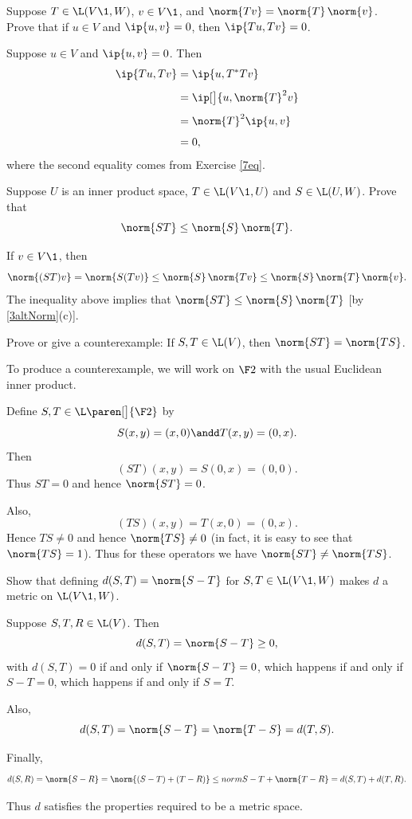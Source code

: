 \exercise
Suppose $T \in \L(V\1, W)$, $v \in V\1$, and $\norm{Tv} = \norm{T} \, \norm{v}$. Prove that if $u \in V$ and $\ip{u, v} = 0$, then
$\ip{Tu, Tv} = 0$.

\begin{Solution}
Suppose $u \in V$ and $\ip{u, v} = 0$. Then
\begin{align*}
\ip{Tu, Tv} &= \ip{u, T^* T v} \\[4bp]
&= \ip[\big]{ u, \norm{T}^2 v } \\[4bp]
&= \norm{T}^2 \ip{u, v} \\[4bp]
&= 0,
\end{align*}
where the second equality comes from Exercise \ref{7eq}.
\end{Solution}

\exercise
Suppose $U$ is an inner product space, $T \in \L(V\1, U)$ and $S \in \L(U, W)$. Prove that \label{2prod}
\[
\norm{ST} \le \norm{S} \, \norm{T}.
\]
\exercisedisplayend

\begin{Solution}
If $v \in V\1$, then
\[
\norm{(ST)v} = \norm{S(Tv)} \le \norm{S} \, \norm{Tv} \le \norm{S} \, \norm{T} \, \norm{v}.
\]
The inequality above implies that $\norm{ST} \le \norm{S} \, \norm {T}$ [by \ref{3altNorm}(c)].
\end{Solution}

\exercise
Prove or give a counterexample: If $S, T \in \L(V)$, then $\norm{ST} = \norm{TS}$.

\begin{Solution}
To produce a counterexample, we will work on $\F 2$ with the usual Euclidean inner product.

Define $S, T \in \L\paren[\big]{\F 2}$ by
\[
S(x, y) = (x, 0) \andd T(x,y) = (0, x).
\]
Then
\[
(ST)(x,y) = S(0,x) = (0, 0).
\]
Thus $ST = 0$ and hence $\norm{ST} = 0$.

Also,
\[
(TS)(x,y) = T(x,0) = (0,x).
\]
Hence $TS \ne 0$ and hence $\norm{TS} \ne 0$ (in fact, it is easy to see that $\norm{TS} = 1$). Thus for these operators we have $\norm{ST} \ne \norm{TS}$.
\end{Solution}

\exercise
Show that defining $d(S, T) = \norm{S-T}$ for $S, T \in \L(V\1, W)$ makes $d$ a metric on $\L(V\1, W)$.\label{7met}

\begin{Solution}
Suppose $S, T, R \in \L(V)$. Then
\[
d(S, T) = \norm{S-T} \ge 0,
\]
with $d(S, T) = 0$ if and only if $\norm{S-T} = 0$, which happens if and only if $S-T = 0$, which happens if and only if $S = T$.

Also,
\[
d(S,T) = \norm{S-T} = \norm{T-S} = d(T, S).
\]

Finally,
\[
d(S, R) = \norm{S-R} = \norm{(S-T) +(T - R)} \le norm{S-T} + \norm{T-R} = d(S, T) + d(T, R).
\]

Thus $d$ satisfies the properties required to be a metric space.
\end{Solution}

